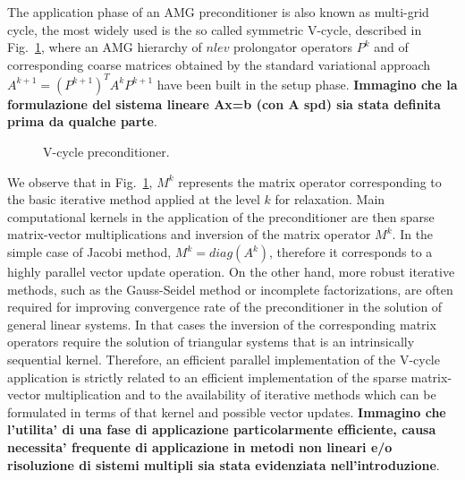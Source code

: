 The application phase of an AMG preconditioner is also known as multi-grid cycle, the most widely used is the so called symmetric V-cycle, described in Fig.~\ref{Vcycle}, where an AMG hierarchy of $nlev$ prolongator operators $P^k$ and of corresponding coarse matrices obtained by the standard variational approach $A^{k+1}=(P^{k+1})^TA^kP^{k+1}$ have been built in the setup phase. \textbf{Immagino che la formulazione del sistema lineare Ax=b (con A spd) sia stata definita prima da qualche parte}.
\begin{figure}[t]
\begin{center}
\caption{V-cycle preconditioner.\label{Vcycle}}
\end{center}
\end{figure}
We observe that in Fig.~\ref{Vcycle}, $M^k$ represents the matrix operator corresponding to the basic iterative method applied at the level $k$ for relaxation.
Main computational kernels in the application of the preconditioner are then sparse matrix-vector multiplications and inversion of the matrix
operator $M^k$. In the simple case of Jacobi method, $M^k=diag(A^k)$, therefore it corresponds to a highly parallel vector update operation.
On the other hand, more robust iterative methods, such as the Gauss-Seidel method or incomplete factorizations, are often required for
improving convergence rate of the preconditioner in the solution of general linear systems. In that cases the inversion of the corresponding matrix operators require the solution of triangular systems that is an intrinsically sequential kernel.
Therefore, an efficient parallel implementation of the V-cycle application is strictly related to an efficient implementation of the sparse matrix-vector multiplication and to the availability of iterative methods which can be formulated in terms of that kernel and possible vector updates.
\textbf{Immagino che l'utilita' di una fase di applicazione particolarmente efficiente, causa necessita' frequente di applicazione in metodi non lineari e/o risoluzione di sistemi multipli sia stata evidenziata nell'introduzione}. 
